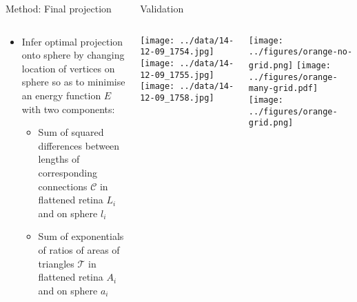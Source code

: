 \documentclass[final,hyperref={pdfpagelabels=false}]{beamer}
\begin{document}
\begin{frame}{}
\begin{columns}[T]
\begin{column}{.33\linewidth}
\begin{block}{Method: Final projection}
\begin{columns}
\begin{column}{0.55\linewidth}
            \begin{itemize}
            \item Infer optimal projection onto sphere by changing
              location of vertices on sphere so as to minimise an
              energy function $E$ with two components:
              \begin{itemize}
              \item Sum of squared differences between lengths of corresponding
                connections $\mathcal{C}$ in flattened retina $L_i$ and on sphere $l_i$
              \item Sum of exponentials of ratios of areas  of 
                triangles $\mathcal{T}$ in flattened retina $A_i$ and  on sphere $a_i$
              \end{itemize}
            \end{itemize}
          \end{column}
        \end{columns}
      \end{block}



    \end{column}

    \begin{column}{.33\linewidth}

      \begin{block}{Validation}
        \begin{columns}

          \texttt{[image: ../data/14-12-09\_1754.jpg]}
          \texttt{[image: ../data/14-12-09\_1755.jpg]}
          \texttt{[image: ../data/14-12-09\_1758.jpg]}

          \texttt{[image: ../figures/orange-no-grid.png]}
          \texttt{[image: ../figures/orange-many-grid.pdf]}
          \texttt{[image: ../figures/orange-grid.png]}



\end{columns}
\end{block}
\end{column}
\end{columns}
\end{frame}
\end{document}

